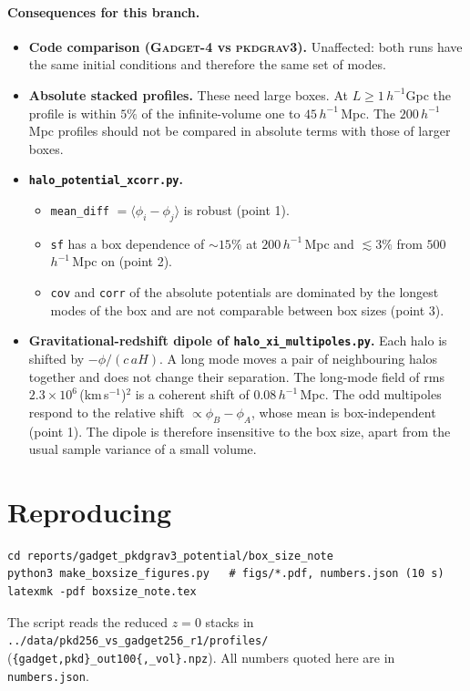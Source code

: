 \documentclass[11pt,a4paper]{article}
\newcommand{\pkd}{\textsc{pkdgrav3}}
\newcommand{\gad}{\textsc{Gadget-4}}
\newcommand{\fp}[1]{\nolinkurl{#1}}
\newcommand{\kms}{(km\,s$^{-1}$)$^2$}
\newcommand{\Mpch}{$h^{-1}$\,Mpc}
\begin{document}
\paragraph{Consequences for this branch.}
\begin{itemize}
\item \textbf{Code comparison (\gad{} vs \pkd).} Unaffected: both runs have the same initial conditions and therefore
  the same set of modes.
\item \textbf{Absolute stacked profiles.} These need large boxes. At $L\ge1\,h^{-1}$Gpc the profile is within $5\%$ of
  the infinite-volume one to $45$\,\Mpch{}. The $200$\,\Mpch{} profiles should not be compared in absolute terms with
  those of larger boxes.
\item \textbf{\fp{halo_potential_xcorr.py}.}
  \begin{itemize}
  \item \fp{mean_diff} $=\langle\phi_i-\phi_j\rangle$ is robust (point 1).
  \item \fp{sf} has a box dependence of $\sim15\%$ at $200$\,\Mpch{} and $\lesssim3\%$ from $500$\,\Mpch{} on
    (point 2).
  \item \fp{cov} and \fp{corr} of the absolute potentials are dominated by the longest modes of the box and are not
    comparable between box sizes (point 3).
  \end{itemize}
\item \textbf{Gravitational-redshift dipole of \fp{halo_xi_multipoles.py}.} Each halo is shifted by
  $-\phi/(c\,aH)$. A long mode moves a pair of neighbouring halos together and does not change their separation. The
  long-mode field of rms $2.3\times10^6$\,\kms{} is a coherent shift of $0.08$\,\Mpch. The odd multipoles respond to
  the relative shift $\propto\phi_B-\phi_A$, whose mean is box-independent (point 1). The dipole is therefore
  insensitive to the box size, apart from the usual sample variance of a small volume.
\end{itemize}

\section{Reproducing}

\begin{verbatim}
cd reports/gadget_pkdgrav3_potential/box_size_note
python3 make_boxsize_figures.py   # figs/*.pdf, numbers.json (10 s)
latexmk -pdf boxsize_note.tex
\end{verbatim}
The script reads the reduced $z=0$ stacks in \fp{../data/pkd256_vs_gadget256_r1/profiles/}
(\fp{\{gadget,pkd\}_out100\{,_vol\}.npz}). All numbers quoted here are in \fp{numbers.json}.
\end{document}
